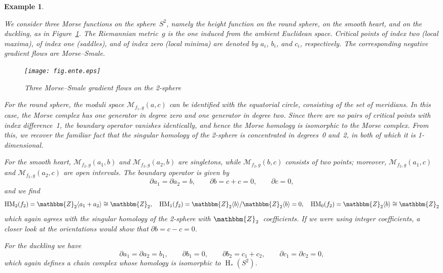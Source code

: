 \documentclass[12pt,twoside]{amsart}
\theoremstyle{plain}
\newtheorem{example}[theorem]{Example}
\numberwithin{figure}{section}
\numberwithin{equation}{section}
\newcommand{\diam}{\hspace*{\fill} $\Diamond$}
\def\H{\operatorname{H}}
\def\HM{\operatorname{HM}}
\def\cm{{\mathcal M}}
\def\ZZ{\mathbbm{Z}}
\def\pp{\partial}
\def\ni{\noindent}
\begin{document}
\begin{example} \label{ex:sphere}
{\rm
We consider three Morse functions on the sphere~$S^2$, 
namely the height function on the round sphere, on the smooth heart, and on the duckling,
as in Figure~\ref{fig.ente}.
The Riemannian metric~$g$ is the one induced from the ambient Euclidean space.
Critical points of index two (local maxima), of index one (saddles), and of index zero (local minima)
are denoted by $a_i$, $b_i$, and $c_i$, respectively. The corresponding negative gradient flows 
are Morse--Smale.
%
\begin{figure}[h]  
 \begin{center}
  \leavevmode\texttt{[image: fig.ente.eps]}
 \end{center}
 \caption{Three Morse--Smale gradient flows on the 2-sphere}
 \label{fig.ente}
\end{figure}
%

\ni
For the round sphere, the moduli space $\cm_{f_1,g}(a,c)$ can be identified with the 
equatorial circle, consisting of the set of meridians. In this case, the Morse complex has one generator in degree zero and one generator in degree two. Since there are no pairs of critical points with index difference~1, the boundary operator vanishes identically, and hence the Morse homology is isomorphic to the Morse complex. From this, we recover the familiar fact that the singular homology of the 2-sphere is concentrated in degrees~0 and~2, in both of which it is 1-dimensional.

For the smooth heart, $\cm_{f_2,g}(a_1,b)$ and $\cm_{f_2,g}(a_2,b)$ are singletons, while
$\cm_{f_2,g}(b,c)$ consists of two points;
moreover, $\cm_{f_2,g}(a_1,c)$ and $\cm_{f_2,g}(a_2,c)$ are open intervals. The boundary operator is given by
\[
\pp a_1 = \pp a_2 = b, \qquad \pp b =  c + c = 0, \qquad \pp c =0,
\]
and we find 
\[
\HM_2(f_2) = \ZZ_2 \langle a_1+a_2 \rangle \cong \ZZ_2, \quad
\HM_1(f_2) = \ZZ_2 \langle b \rangle / \ZZ_2 \langle b \rangle = 0, \quad
\HM_0(f_2) = \ZZ_2 \langle b \rangle \cong \ZZ_2 
\]
which again agrees with the singular homology of the 2-sphere with $\ZZ_2$~coefficients. 
If we were using integer coefficients, a closer look at the orientations would show that 
$\pp b = c - c =0$.

For the duckling we have
\[
\pp a_1 = \pp a_2 = b_1, \qquad \pp b_1 =0, \qquad \pp b_2 = c_1+c_2, \qquad \pp c_1=\pp c_2= 0,
\]
which again defines a chain complex whose homology is isomorphic to $\H_*(S^2)$. 
}
\end{example}
\end{document}
